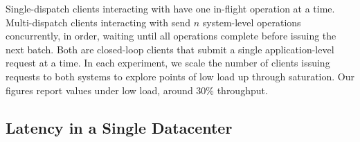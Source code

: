 Single-dispatch clients interacting with \mpaxos{} have one in-flight operation at
a time. Multi-dispatch clients interacting with \system{} send $n$ system-level
operations concurrently, in order, waiting until all operations complete before
issuing the next batch. Both are closed-loop clients that submit a single
application-level request at a time.
In each experiment, we scale the number of clients issuing requests to both
systems to explore points of low load up through saturation. Our figures report values under low load, around 30\% throughput.




%


\subsection{Latency in a Single Datacenter}
\label{sec:shards}

